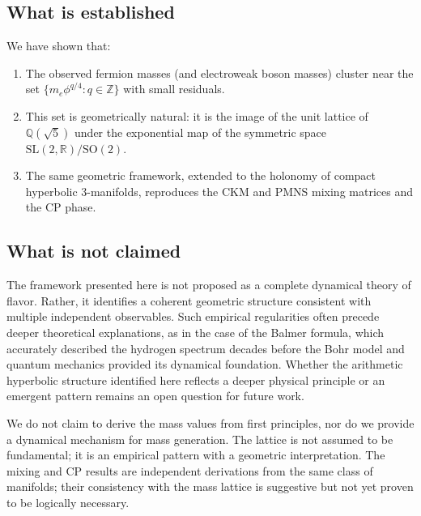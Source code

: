 ﻿\documentclass[12pt]{article}
\theoremstyle{definition}
\begin{document}
\subsection{What is established}
We have shown that:
\begin{enumerate}
\item The observed fermion masses (and electroweak boson masses) cluster near the set $\{m_e \phi^{q/4} : q\in\mathbb{Z}\}$ with small residuals.
\item This set is geometrically natural: it is the image of the unit lattice of $\mathbb{Q}(\sqrt5)$ under the exponential map of the symmetric space $\mathrm{SL}(2,\mathbb{R})/\mathrm{SO}(2)$.
\item The same geometric framework, extended to the holonomy of compact hyperbolic 3-manifolds, reproduces the CKM and PMNS mixing matrices and the CP phase.
\end{enumerate}

\subsection{What is not claimed}

The framework presented here is not proposed as a complete dynamical theory of flavor. Rather, it identifies a coherent geometric structure consistent with multiple independent observables. Such empirical regularities often precede deeper theoretical explanations, as in the case of the Balmer formula, which accurately described the hydrogen spectrum decades before the Bohr model and quantum mechanics provided its dynamical foundation. Whether the arithmetic hyperbolic structure identified here reflects a deeper physical principle or an emergent pattern remains an open question for future work.

We do not claim to derive the mass values from first principles, nor do we provide a dynamical mechanism for mass generation. The lattice is not assumed to be fundamental; it is an empirical pattern with a geometric interpretation. The mixing and CP results are independent derivations from the same class of manifolds; their consistency with the mass lattice is suggestive but not yet proven to be logically necessary.
\end{document}
